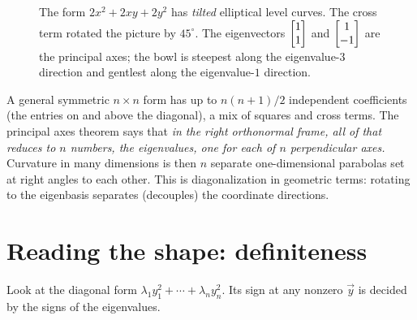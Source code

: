 \begin{figure}[H]
\centering
{}
\caption{The form $2x^2+2xy+2y^2$ has \emph{tilted} elliptical level curves. The
cross term rotated the picture by $45^\circ$. The eigenvectors $\begin{bmatrix}1\\1\end{bmatrix}$ and
$\begin{bmatrix}1\\-1\end{bmatrix}$ are the principal axes; the bowl is steepest along the eigenvalue-$3$
direction and gentlest along the eigenvalue-$1$ direction.}
\label{ch36:fig-tilted}
\end{figure}

\begin{aestheticbox}
A general symmetric $n\times n$ form has up to $n(n+1)/2$ independent coefficients
(the entries on and above the diagonal), a mix of squares and cross terms. The
principal axes theorem says that \emph{in the right orthonormal frame, all of that
reduces to $n$ numbers, the eigenvalues, one for each of $n$ perpendicular axes.}
Curvature in many dimensions is then $n$ separate one-dimensional parabolas set at
right angles to each other. This is diagonalization in geometric terms: rotating to
the eigenbasis separates (decouples) the coordinate directions.
\end{aestheticbox}

\section{Reading the shape: definiteness}
\label{ch36:definiteness}

Look at the diagonal form $\lambda_1 y_1^2 + \cdots + \lambda_n y_n^2$. Its sign at
any nonzero $\vec{y}$ is decided by the signs of the eigenvalues.

